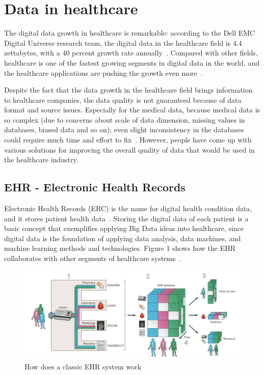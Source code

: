 \section{Data in healthcare}
The digital data growth in healthcare is remarkable: according to the Dell 
EMC Digital Universe research team, the digital data in 
the healthcare field is 
4.4 zettabytes, with a 40 percent growth rate annually~\cite{EMC2015}. 
Compared with other fields, healthcare is one of the fastest growing 
segments in digital data in the world, and the healthcare applications 
are pushing the growth even more~\cite{EMC2015}. 

Despite the fact that the data growth in the healthcare field brings 
information to healthcare 
companies, the data quality is not guaranteed because of data format 
and source issues. Especially for the medical data, because medical 
data is so complex (due to concerns about scale of data dimension, 
missing values in databases, biased data and so on); even slight 
inconsistency in the databases could require much time and 
effort to fix~\cite{Lee2017}. However, 
people have come up with various solutions for improving the 
overall quality of data that would be used in the healthcare industry.

\subsection{EHR - Electronic Health Records}
Electronic Health Records (ERC) is the name for digital 
health condition data, and 
it stores patient health data~\cite{EHR}. Storing the 
digital data of each 
patient is a basic concept that exemplifies applying Big Data
 ideas into healthcare, 
since digital data is the foundation of applying data analysis, data 
machines, and machine learning methods and technologies. 
Figure 1 shows 
how the EHR collaborates with other segments of healthcare 
systems~\cite{Reddy2013}.
 
\begin{figure}[!ht]
\centering\includegraphics[width=\columnwidth]{images/EHR.png}
\caption{How does a classic EHR system work}\label{f:EHR}
\end{figure}

